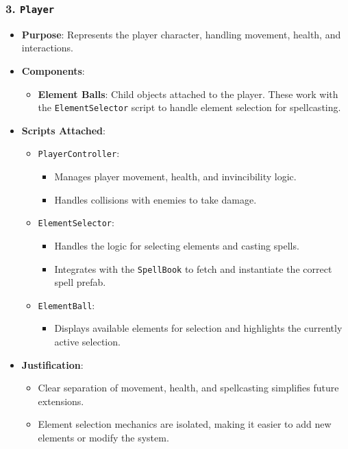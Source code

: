 \documentclass[10pt,twocolumn]{article}
\begin{document}
\subsubsection{3. \texttt{Player}}
\begin{itemize}
    \item \textbf{Purpose}: Represents the player character, handling movement, health, and interactions.
    \item \textbf{Components}:
    \begin{itemize}
        \item \textbf{Element Balls}: Child objects attached to the player. These work with the \texttt{ElementSelector} script to handle element selection for spellcasting.
    \end{itemize}
    \item \textbf{Scripts Attached}:
    \begin{itemize}
        \item \texttt{PlayerController}:
        \begin{itemize}
            \item Manages player movement, health, and invincibility logic.
            \item Handles collisions with enemies to take damage.
        \end{itemize}
        \item \texttt{ElementSelector}:
        \begin{itemize}
            \item Handles the logic for selecting elements and casting spells.
            \item Integrates with the \texttt{SpellBook} to fetch and instantiate the correct spell prefab.
        \end{itemize}
        \item \texttt{ElementBall}:
        \begin{itemize}
            \item Displays available elements for selection and highlights the currently active selection.
        \end{itemize}
    \end{itemize}
    \item \textbf{Justification}:
    \begin{itemize}
        \item Clear separation of movement, health, and spellcasting simplifies future extensions.
        \item Element selection mechanics are isolated, making it easier to add new elements or modify the system.
    \end{itemize}
\end{itemize}
\end{document}
